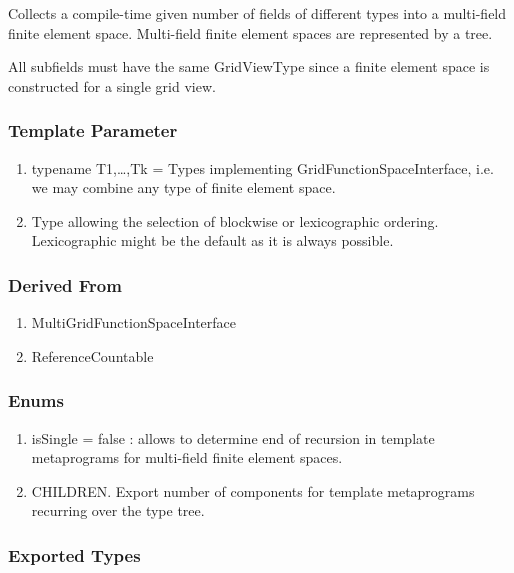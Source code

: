 \documentclass[11pt,a4paper,DIV11,%
notitlepage,oneside,abstracton,%
bibtotoc]{scrartcl}
\begin{document}
Collects a compile-time given number of fields of different types into
a multi-field finite element space. 
Multi-field finite element spaces are represented by a tree.

All subfields must have the same GridViewType since a finite element
space is constructed for a single grid view.

\subsubsection{Template Parameter}

\begin{enumerate}[1)]
\item typename T1,\ldots,Tk = Types implementing GridFunctionSpaceInterface, 
i.e. we may combine any type of finite element space. 
\item Type allowing the selection of blockwise or lexicographic
  ordering. Lexicographic might be the default as it is always possible.
\end{enumerate}

\subsubsection{Derived From}

\begin{enumerate}[1)]
\item MultiGridFunctionSpaceInterface
\item ReferenceCountable
\end{enumerate}

\subsubsection{Enums}

\begin{enumerate}[1)]
\item isSingle = false : allows to determine end of recursion in
  template metaprograms for multi-field finite element spaces.
\item CHILDREN. Export number of components for template
  metaprograms recurring over the type tree.
\end{enumerate}

\subsubsection{Exported Types}
\end{document}

